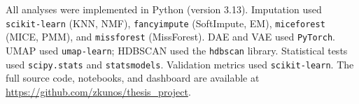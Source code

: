 \begin{sloppypar}
All analyses were implemented in Python (version 3.13).
Imputation used
\texttt{scikit-learn} (KNN, NMF),
\texttt{fancyimpute} (SoftImpute, EM),
\texttt{miceforest} (MICE, PMM), and
\texttt{missforest} (MissForest).
DAE and VAE used \texttt{PyTorch}.
UMAP used \texttt{umap-learn};
HDBSCAN used the \texttt{hdbscan} library.
Statistical tests used \texttt{scipy.stats} and \texttt{statsmodels}.
Validation metrics used \texttt{scikit-learn}.
The full source code, notebooks, and dashboard are available at
\url{https://github.com/zkunos/thesis_project}.
\end{sloppypar}

